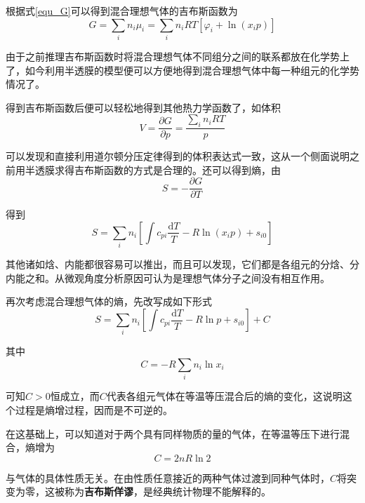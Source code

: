 \documentclass[UTF8]{ctexart}
\begin{document}
	根据式\ref{equ_G}可以得到混合理想气体的吉布斯函数为
	\begin{equation}
	G=\sum_{i} n_{i} \mu_{i}=\sum_{i} n_{i} R T\left[\varphi_{i}+\ln \left(x_{i} p\right)\right]
	\end{equation}
	
\noindent 由于之前推理吉布斯函数时将混合理想气体不同组分之间的联系都放在化学势上了，如今利用半透膜的模型便可以方便地得到混合理想气体中每一种组元的化学势情况了。

	得到吉布斯函数后便可以轻松地得到其他热力学函数了，如体积
	\begin{equation}
	V=\frac{\partial G}{\partial p}=\frac{\sum_{i} n_{i} R T}{p}
	\end{equation}
	
\noindent 可以发现和直接利用道尔顿分压定律得到的体积表达式一致，这从一个侧面说明之前用半透膜求得吉布斯函数的方式是合理的。还可以得到熵，由
\begin{equation}
S=-\frac{\partial G}{\partial T}
\end{equation}

\noindent 得到
\begin{equation}
S=\sum_{i} n_{i}\left[\int c_{p i} \frac{\mathrm{d} T}{T}-R \ln \left(x_{i} p\right)+s_{i0}\right]
\end{equation}

	其他诸如焓、内能都很容易可以推出，而且可以发现，它们都是各组元的分焓、分内能之和。从微观角度分析原因可认为是理想气体分子之间没有相互作用。
	
	再次考虑混合理想气体的熵，先改写成如下形式
	\begin{equation}
	S=\sum_{i} n_{i}\left[\int c_{p i} \frac{\mathrm{d} T}{T}-R \ln p+s_{i 0}\right]+C
	\end{equation}
	
\noindent 其中
\begin{equation}
C=-R \sum_{i} n_{i} \ln x_{i}
\end{equation}

\noindent 可知$ C > 0 $恒成立，而$ C $代表各组元气体在等温等压混合后的熵的变化，这说明这个过程是熵增过程，因而是不可逆的。

	在这基础上，可以知道对于两个具有同样物质的量的气体，在等温等压下进行混合，熵增为
	\begin{equation}
	C=2 n R \ln 2
	\end{equation}
	
\noindent 与气体的具体性质无关。在由性质任意接近的两种气体过渡到同种气体时，$ C $将突变为零，这被称为\textbf{吉布斯佯谬}，是经典统计物理不能解释的。
\end{document}
